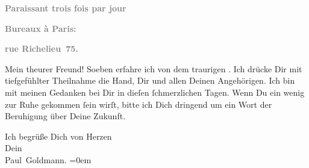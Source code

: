\pstart
           \begin{otherlanguage}{french}\textcolor{gray}{\textbf{\textbf{Paraissant trois fois par jour}}}\end{otherlanguage}\pend
           
\pstart
           \begin{otherlanguage}{french}\textcolor{gray}{\textbf{\textbf{Bureaux à Paris:}}}\end{otherlanguage}\pend
           
\pstart
           \begin{otherlanguage}{french}\textcolor{gray}{\textbf{\textbf{rue Richelieu 75.}}}\end{otherlanguage}\pend
           
\pstart\center{}Mein theurer Freund!\pend\vspace{0.5em}
\pstart
           Soeben erfahre ich von dem traurigen \label{K_L02706-1v}\label{K_L02706-1}. Ich drücke Dir mit tiefgefühlter Theilnahme die Hand, Dir und
               allen Deinen Angehörigen. Ich bin mit meinen Gedanken bei Dir in dieſen{ }ſchmerzlichen
               Tagen. Wenn Du ein wenig zur Ruhe gekommen{ }ſein wirſt, bitte ich Dich dringend um ein
               Wort der Beruhigung über Deine Zukunft.\pend
           
\pstart
           Ich begrüße Dich von Herzen {\\[\baselineskip]}Dein {\\[\baselineskip]}\spacefill\mbox{Paul Goldmann.}\pend
           \leftskip=0em{}\endnumbering{}  \newcommand{\dateiname}{L02706}\newcommand{\titel}{Paul Goldmann an Arthur Schnitzler, 4. 5. [1893]}\newcommand{\editorInnen}{Martin Anton Müller und Laura Untner}
